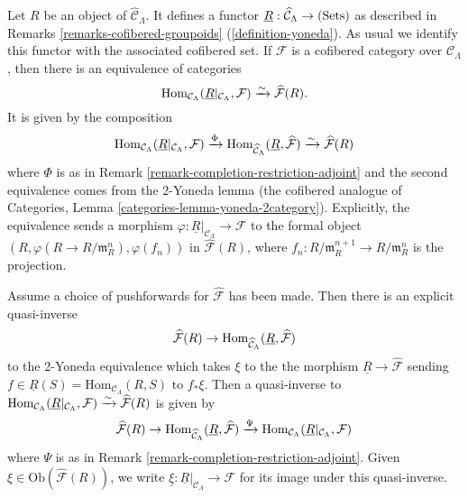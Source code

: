 \begin{remark}
\label{remark-formal-objects-yoneda}
Let $R$ be an object of $\widehat{\mathcal C}_{\Lambda}$.  It defines a functor 
$\underline{R}: \widehat{\mathcal C}_{\Lambda} \rightarrow \textnormal{(Sets)}$ 
as described in Remarks \ref{remarks-cofibered-groupoids} 
(\ref{definition-yoneda}). As usual we identify this functor with the 
associated cofibered set.  If $\mathcal F$ is a cofibered category over 
$\mathcal C_{\Lambda}$, then there is an equivalence of categories
\[
\textnormal{Hom}_{\mathcal C_{\Lambda}}(\underline{R}|_{\mathcal C_{\Lambda}}, 
\mathcal F) 
\xrightarrow{\sim} 
\widehat{\mathcal F}(R).
\]
It is given by the composition
\[
\textnormal{Hom}_{\mathcal C_{\Lambda}}(\underline{R}|_{\mathcal C_{\Lambda}}, 
\mathcal F) 
\xrightarrow{\Phi} 
\textnormal{Hom}_{\widehat{\mathcal C}_{\Lambda}}(\underline{R}, 
\widehat{\mathcal F}) 
\xrightarrow{\sim}
\widehat{\mathcal F}(R)
\]
where $\Phi$ is as in Remark \ref{remark-completion-restriction-adjoint} and 
the second equivalence comes from the 2-Yoneda lemma (the cofibered analogue of 
Categories, Lemma \ref{categories-lemma-yoneda-2category}).
Explicitly, the equivalence sends a 
morphism $\varphi: \underline{R}|_{\mathcal C_{\Lambda}} \rightarrow \mathcal 
F$ to the formal object $(R, \varphi(R \rightarrow R/\mathfrak{m}_R^n), 
\varphi(f_n))$ in $\widehat{\mathcal F}(R)$, where $f_{n}: 
R/\mathfrak{m}_R^{n+1} \rightarrow R/\mathfrak{m}_{R}^{n}$ is the projection.  

\medskip \noindent
Assume a choice of pushforwards for $\widehat{\mathcal F}$ has been made.  Then 
there is an explicit quasi-inverse
\[ \widehat{\mathcal F}(R) \rightarrow \textnormal{Hom}_{\widehat{\mathcal 
C}_{\Lambda}}(\underline{R}, \widehat{\mathcal F}) \]
to the 2-Yoneda equivalence which takes $\xi$ to the the morphism 
$\underline{R} \rightarrow \widehat{\mathcal F}$ sending $f \in 
\underline{R}(S) = \text{Hom}_{\mathcal C_{\Lambda}}(R,S)$ to $f_* \xi$.  Then 
a quasi-inverse to $\textnormal{Hom}_{\mathcal 
C_{\Lambda}}(\underline{R}|_{\mathcal C_{\Lambda}}, \mathcal F) 
\xrightarrow{\sim} 
\widehat{\mathcal F}(R)$ is given by
\[
\widehat{\mathcal F}(R) 
\rightarrow 
\textnormal{Hom}_{\widehat{\mathcal C}_{\Lambda}}(\underline{R}, 
\widehat{\mathcal F})
\xrightarrow{\Psi}
\textnormal{Hom}_{\mathcal C_{\Lambda}}(\underline{R}|_{\mathcal C_{\Lambda}}, 
\mathcal F)
\]
where $\Psi$ is as in Remark \ref{remark-completion-restriction-adjoint}.  
Given $\xi \in \text{Ob}(\widehat{\mathcal F}(R))$, we write $\underline{\xi}: 
\underline{R}|_{\mathcal C_{\Lambda}} \rightarrow \mathcal F$ for its image 
under this quasi-inverse.
\end{remark}

